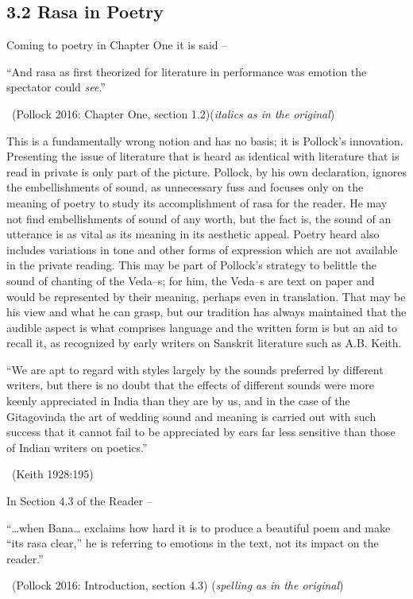 \subsection*{3.2 Rasa in Poetry}

Coming to poetry in Chapter One it is said –

\begin{myquote}
“And rasa as first theorized for literature in performance was emotion the spectator could \textit{see}.” 

~\hfill (Pollock 2016: Chapter One, section 1.2)(\textit{italics as in the original})
\end{myquote}

This is a fundamentally wrong notion and has no basis; it is Pollock’s innovation. Presenting the issue of literature that is heard as identical with literature that is read in private is only part of the picture. Pollock, by his own declaration, ignores the embellishments of sound, as unnecessary fuss and focuses only on the meaning of poetry to study its accomplishment of rasa for the reader. He may not find embellishments of sound of any worth, but the fact is, the sound of an utterance is as vital as its meaning in its aesthetic appeal. Poetry heard also includes variations in tone and other forms of expression which are not available in the private reading. This may be part of Pollock’s strategy to belittle the sound of chanting of the Veda–s; for him, the Veda–s are text on paper and would be represented by their meaning, perhaps even in translation. That may be his view and what he can grasp, but our tradition has always maintained that the audible aspect is what comprises language and the written form is but an aid to recall it, as recognized by early writers on Sanskrit literature such as A.B. Keith.

\begin{myquote}
“We are apt to regard with styles largely by the sounds preferred by different writers, but there is no doubt that the effects of different sounds were more keenly appreciated in India than they are by us, and in the case of the Gitagovinda the art of wedding sound and meaning is carried out with such success that it cannot fail to be appreciated by ears far less sensitive than those of Indian writers on poetics.” 

~\hfill (Keith 1928:195)
\end{myquote}

In Section 4.3 of the Reader –

\begin{myquote}
“…when Bana… exclaims how hard it is to produce a beautiful poem and make “its rasa clear,” he is referring to emotions in the text, not its impact on the reader.” 

~\hfill (Pollock 2016: Introduction, section 4.3) (\textit{spelling as in the original})
\end{myquote}

